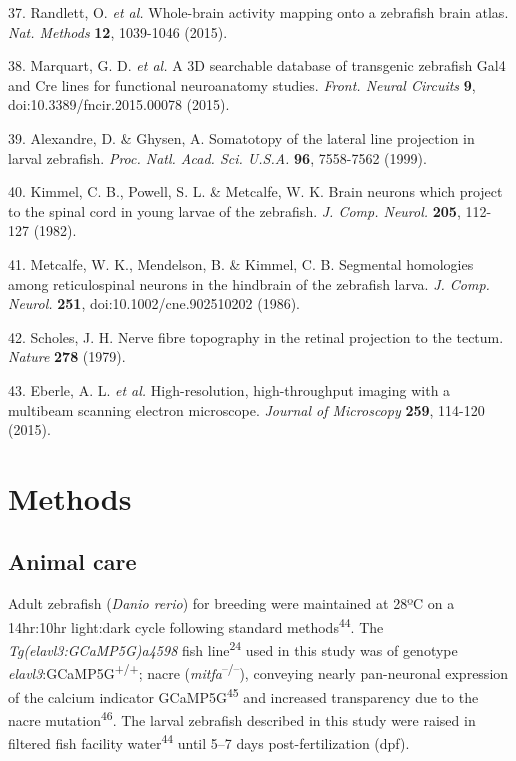 \documentclass{article}
\begin{document}
\begin{hangpars}
37. Randlett, O.\textit{ et al.} Whole-brain activity mapping onto a zebrafish brain atlas. \textit{Nat. Methods} \textbf{12}, 1039-1046 (2015).

38. Marquart, G. D.\textit{ et al.} A 3D searchable database of transgenic zebrafish Gal4 and Cre lines for functional neuroanatomy studies. \textit{Front. Neural Circuits} \textbf{9}, doi:10.3389/fncir.2015.00078 (2015).

39. Alexandre, D. \& Ghysen, A. Somatotopy of the lateral line projection in larval zebrafish. \textit{Proc. Natl. Acad. Sci. U.S.A.} \textbf{96}, 7558-7562 (1999).

40. Kimmel, C. B., Powell, S. L. \& Metcalfe, W. K. Brain neurons which project to the spinal cord in young larvae of the zebrafish. \textit{J. Comp. Neurol.} \textbf{205}, 112-127 (1982).

41. Metcalfe, W. K., Mendelson, B. \& Kimmel, C. B. Segmental homologies among reticulospinal neurons in the hindbrain of the zebrafish larva. \textit{J. Comp. Neurol.} \textbf{251}, doi:10.1002/cne.902510202 (1986).


42. Scholes, J. H. Nerve fibre topography in the retinal projection to the tectum. \textit{Nature} \textbf{278} (1979).

43. Eberle, A. L.\textit{ et al.} High-resolution, high-throughput imaging with a multibeam scanning electron microscope. \textit{Journal of Microscopy} \textbf{259}, 114-120 (2015).
\end{hangpars}


\section*{Methods}

\subsection*{Animal care}

Adult zebrafish (\textit{Danio rerio}) for breeding were maintained at 28ºC on a 14hr:10hr light:dark cycle following standard methods\textsuperscript{44}. The \textit{Tg(elavl3:GCaMP5G)a4598} fish line\textsuperscript{24} used in this study was of genotype \textit{elavl3}:GCaMP5G\textsuperscript{+/+}; nacre (\textit{mitfa}\textsuperscript{–/–}), conveying nearly pan-neuronal expression of the calcium indicator GCaMP5G\textsuperscript{45} and increased transparency due to the nacre mutation\textsuperscript{46}. The larval zebrafish described in this study were raised in filtered fish facility water\textsuperscript{44} until 5–7 days post-fertilization (dpf).
\end{document}

